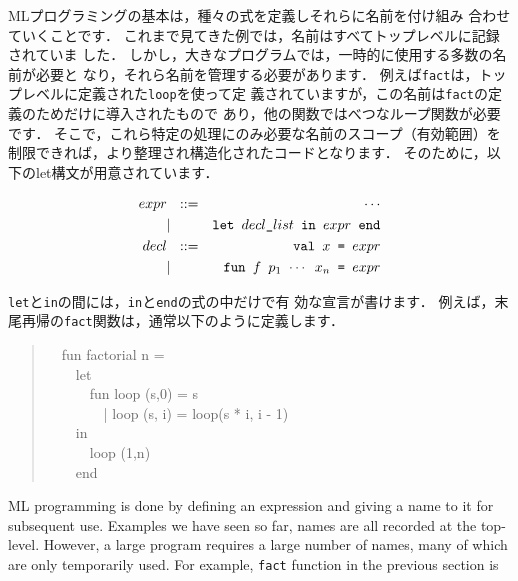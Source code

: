 \documentclass{jbook}
\newcommand{\myem}{\mbox{\ \ }}
\begin{document}
\ifjp%
	MLプログラミングの基本は，種々の式を定義しそれらに名前を付け組み
合わせていくことです．
	これまで見てきた例では，名前はすべてトップレベルに記録されていま
した．
	しかし，大きなプログラムでは，一時的に使用する多数の名前が必要と
なり，それら名前を管理する必要があります．
	例えば{\tt fact}は，トップレベルに定義された{\tt loop}を使って定
義されていますが，この名前は{\tt fact}の定義のためだけに導入されたもので
あり，他の関数ではべつなループ関数が必要です．
	そこで，これら特定の処理にのみ必要な名前のスコープ（有効範囲）を
制限できれば，より整理され構造化されたコードとなります．
	そのために，以下のlet構文が用意されています．
\begin{tt}
\begin{eqnarray*}
expr &\mbox{\ \ }::=& \cdots \\
     &|& \mbox{\tt let\ $decl\_list$\ in\ $expr$\ end}
\\
decl &\mbox{\ \ }::=& \mbox{\tt val\ $x$ = $expr$}
\\
     &|& \mbox{\tt fun\ $f$\ $p_1$ $\cdots$ $x_n$ =  $expr$}
\end{eqnarray*}
\end{tt}
	{\tt let}と{\tt in}の間には，{\tt in}と{\tt end}の式の中だけで有
効な宣言が書けます．
	例えば，末尾再帰の{\tt fact}関数は，通常以下のように定義します．
\begin{tt}
\begin{quote}
\myem  fun factorial n =
\\\myem\myem    let
\\\myem\myem\myem      fun loop (s,0) = s
\\\myem\myem\myem\ \         | loop (s, i) = loop(s * i, i - 1)
\\\myem\myem    in
\\\myem\myem\myem      loop (1,n)
\\\myem\myem    end
\end{quote}
\end{tt}
\else%
	ML programming is done by defining an expression and giving a
name to it for subsequent use.
	Examples we have seen so far, names are all recorded at the
top-level.
	However, a large program requires a large number of names, many
of which are only temporarily used.
	For example, {\tt fact} function in the previous section is
\end{document}
